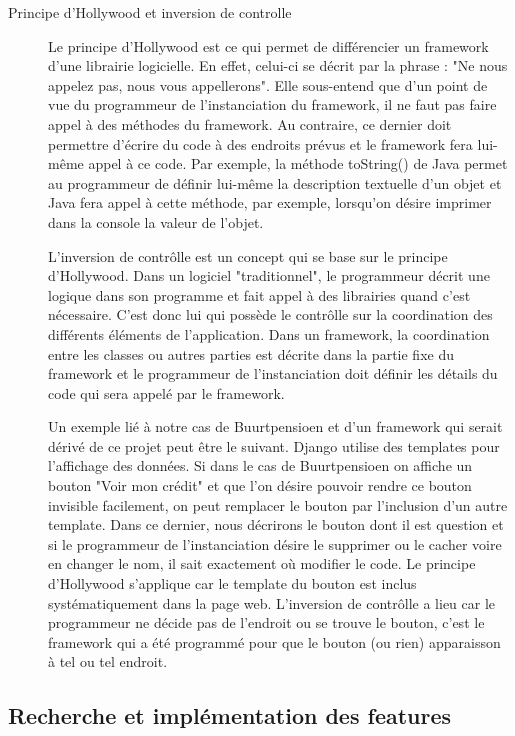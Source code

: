 \begin{description}
\item[Principe d'Hollywood et inversion de controlle]
Le principe d'Hollywood est ce qui permet de différencier un framework d'une librairie logicielle.  En effet,  celui-ci se décrit par la phrase : "Ne nous appelez pas,  nous vous appellerons".  Elle sous-entend que d'un point de vue du programmeur de l'instanciation du framework,   il ne faut pas faire appel à des méthodes du framework.  Au contraire,  ce dernier doit permettre d'écrire du code à des endroits prévus et le framework fera lui-même appel à ce code.  Par exemple,  la méthode toString() de Java permet au programmeur de définir lui-même la description textuelle d'un objet et Java fera appel à cette méthode,  par exemple,  lorsqu'on désire imprimer dans la console la valeur de l'objet. 

L'inversion de contrôlle est un concept qui se base sur le principe d'Hollywood.  Dans un logiciel "traditionnel",  le programmeur décrit une logique dans son programme et fait appel à des librairies quand c'est nécessaire.  C'est donc lui qui possède le contrôlle sur la coordination des différents éléments de l'application.  Dans un framework,  la coordination entre les classes ou autres parties est décrite dans la partie fixe du framework et le programmeur de l'instanciation doit définir les détails du code qui sera appelé par le framework.  

Un exemple lié à notre cas de Buurtpensioen et d'un framework qui serait dérivé de ce projet peut être le suivant.  Django utilise des templates pour l'affichage des données.  Si dans le cas de Buurtpensioen on affiche un bouton "Voir mon crédit" et que l'on désire pouvoir rendre ce bouton invisible facilement,  on peut remplacer le bouton par l'inclusion d'un autre template.  Dans ce dernier,  nous décrirons le bouton dont il est question et si le programmeur de l'instanciation désire le supprimer ou le cacher voire en changer le nom,  il sait exactement où modifier le code.  Le principe d'Hollywood s'applique car le template du bouton est inclus systématiquement dans la page web.  L'inversion de contrôlle a lieu car le programmeur ne décide pas de l'endroit ou se trouve le bouton,  c'est le framework qui a été programmé pour que le bouton (ou rien) apparaisson à tel ou tel endroit.  

\end{description}


\subsection{Recherche et implémentation des features}

